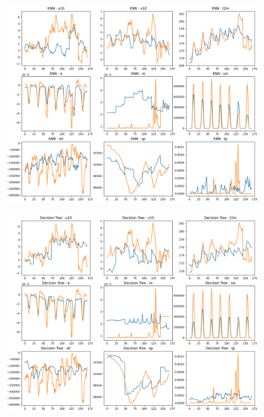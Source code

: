 \begin{figure}[H]
    \centering
    \includegraphics[width=\textwidth]{images/knn_week.png}
    \caption{}
    \label{knn-week}
\end{figure}

\begin{figure}[H]
    \centering
    \includegraphics[width=\textwidth]{images/Decision_tree_week.png}
    \caption{}
    \label{tree-week}
\end{figure}

